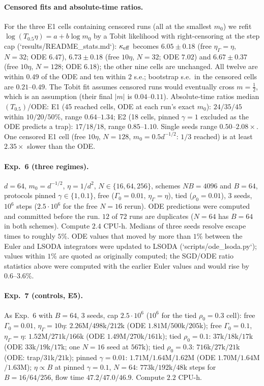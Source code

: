 \paragraph{Censored fits and absolute-time ratios.} For the three E1 cells containing censored runs (all at the smallest $m_0$) we refit
$\log(T_{0.5}\eta)=a+b\log m_0$ by a Tobit likelihood with right-censoring at the step cap (`results/README\_stats.md`): $\kappa_{\rm eff}$ becomes
$6.05\pm0.18$ (free $\eta_\Gamma=\eta$, $N=32$; ODE $6.47$), $6.73\pm0.18$ (free $10\eta$, $N=32$; ODE $7.02$) and $6.67\pm0.37$ (free $10\eta$, $N=128$;
ODE $6.18$); the other nine cells are unchanged. All twelve are within $0.49$ of the ODE and ten within $2$ s.e.; bootstrap s.e.\ in the
censored cells are $0.21$--$0.49$. The Tobit fit assumes censored runs would eventually cross $m=\tfrac12$, which is an assumption (their
final $|m|$ is $0.04$--$0.11$). Absolute-time ratios median$(T_{0.5})$/ODE: E1 (45 reached cells, ODE at each run's exact $m_0$): $24/35/45$ within
$10/20/50\%$, range $0.64$--$1.34$; E2 (18 cells, pinned $\gamma=1$ excluded as the ODE predicts a trap): $17/18/18$, range $0.85$--$1.10$. Single
seeds range $0.50$--$2.08\times$. One censored E1 cell (free $10\eta$, $N=128$, $m_0=0.5d^{-1/2}$: $1/3$ reached) is at least $2.35\times$ slower than the ODE.

\paragraph{Exp.~6 (three regimes).} $d=64$, $m_0=d^{-1/2}$, $\eta=1/d^2$, $N\in\{16,64,256\}$, schemes $NB=4096$ and $B=64$, protocols pinned
$\gamma\in\{1,0.1\}$, free ($\Gamma_0=0.01$, $\eta_\Gamma=\eta$), tied ($\rho_0=0.01$), 3 seeds, $10^6$ steps ($2.5\cdot10^6$ for the free $N=16$ rerun). ODE
predictions were computed and committed before the run. $12$ of $72$ runs are duplicates ($N=64$ has $B=64$ in both schemes). Compute $2.4$ CPU-h. Medians of three seeds resolve escape times to roughly $5\%$. ODE values that moved by more than $1\%$ between the Euler and LSODA integrators were updated to LSODA
(`scripts/ode\_lsoda.py`); values within $1\%$ are quoted as originally computed; the SGD/ODE ratio statistics above were computed with the earlier Euler values and would rise by $0.6$--$3.6\%$.

\paragraph{Exp.~7 (controls, E5).} As Exp.~6 with $B=64$, 3 seeds, cap $2.5\cdot10^6$ ($10^6$ for the tied $\rho_0=0.3$ cell): free $\Gamma_0=0.01$,
$\eta_\Gamma=10\eta$: $2.26$M$/498$k$/212$k (ODE $1.81$M$/500$k$/205$k); free $\Gamma_0=0.1$, $\eta_\Gamma=\eta$: $1.52$M$/271$k$/166$k (ODE $1.49$M$/270$k$/161$k);
tied $\rho_0=0.1$: $37$k$/18$k$/17$k (ODE $33$k$/19$k$/17$k; one $N=16$ seed at $567$k); tied $\rho_0=0.3$: $716$k$/27$k$/21$k (ODE: trap$/31$k$/21$k);
pinned $\gamma=0.01$: $1.71$M$/1.64$M$/1.62$M (ODE $1.70$M$/1.64$M$/1.63$M); $\eta\propto B$ at pinned $\gamma=0.1$, $N=64$: $773$k$/192$k$/48$k steps for
$B=16/64/256$, flow time $47.2/47.0/46.9$. Compute $2.2$ CPU-h.

